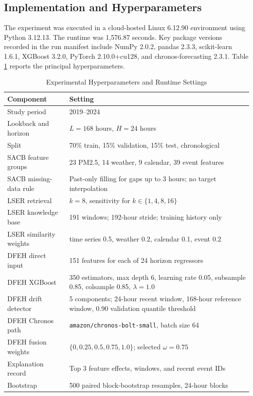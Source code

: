 \subsection{Implementation and Hyperparameters}
The experiment was executed in a cloud-hosted Linux 6.12.90 environment using
Python 3.12.13. The runtime was 1,576.87 seconds. Key package versions recorded in the
run manifest include NumPy 2.0.2, pandas 2.3.3, scikit-learn 1.6.1, XGBoost
3.2.0, PyTorch 2.10.0+cu128, and chronos-forecasting 2.3.1. Table
\ref{tab:hyperparameters} reports the principal hyperparameters.

\begin{table}[!t]
\centering
\caption{Experimental Hyperparameters and Runtime Settings}
\label{tab:hyperparameters}
\renewcommand{\arraystretch}{0.94}
\begin{tabular}{ll}
\toprule
Component & Setting \\
\midrule
Study period & 2019--2024 \\
Lookback and horizon & $L=168$ hours, $H=24$ hours \\
Split & 70\% train, 15\% validation, 15\% test, chronological \\
SACB feature groups & 23 PM2.5, 14 weather, 9 calendar, 39 event features \\
SACB missing-data rule & Past-only filling for gaps up to 3 hours; no target interpolation \\
LSER retrieval & $k=8$, sensitivity for $k \in \{1,4,8,16\}$ \\
LSER knowledge base & 191 windows; 192-hour stride; training history only \\
LSER similarity weights & time series 0.5, weather 0.2, calendar 0.1, event 0.2 \\
DFEH direct input & 151 features for each of 24 horizon regressors \\
DFEH XGBoost & 350 estimators, max depth 6, learning rate 0.05, subsample 0.85,
colsample 0.85, $\lambda=1.0$ \\
DFEH drift detector & 5 components; 24-hour recent window, 168-hour reference window,
0.90 validation quantile threshold \\
DFEH Chronos path & \texttt{amazon/chronos-bolt-small}, batch size 64 \\
DFEH fusion weights & $\{0,0.25,0.5,0.75,1.0\}$; selected $\omega=0.75$ \\
Explanation record & Top 3 feature effects, windows, and recent event IDs \\
Bootstrap & 500 paired block-bootstrap resamples, 24-hour blocks \\
\bottomrule
\end{tabular}
\end{table}

